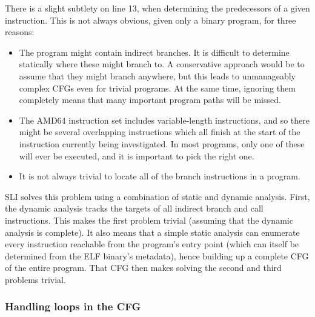 \documentclass[12pt,a4paper]{book}
\begin{document}
There is a slight subtlety on line 13, when determining the predecessors of a given instruction.
This is not always obvious, given only a binary program, for three reasons:

\begin{itemize}
\item
  The program might contain indirect branches.
  It is difficult to determine statically where these might branch to.
  A conservative approach would be to assume that they might branch anywhere, but this leads to unmanageably complex CFGs even for trivial programs.
  At the same time, ignoring them completely means that many important program paths will be missed.
\item
  The AMD64 instruction set includes variable-length instructions, and so there might be several overlapping instructions which all finish at the start of the instruction currently being investigated.
  In most programs, only one of these will ever be executed, and it is important to pick the right one.
\item
  It is not always trivial to locate all of the branch instructions in a program.
\end{itemize}

SLI solves this problem using a combination of static and dynamic analysis.
First, the dynamic analysis tracks the targets of all indirect branch and call instructions.
This makes the first problem trivial (assuming that the dynamic analysis is complete).
It also means that a simple static analysis can enumerate every instruction reachable from the program's entry point (which can itself be determined from the ELF binary's metadata), hence building up a complete CFG of the entire program.
That CFG then makes solving the second and third problems trivial.




\subsubsection{Handling loops in the CFG}
\end{document}
